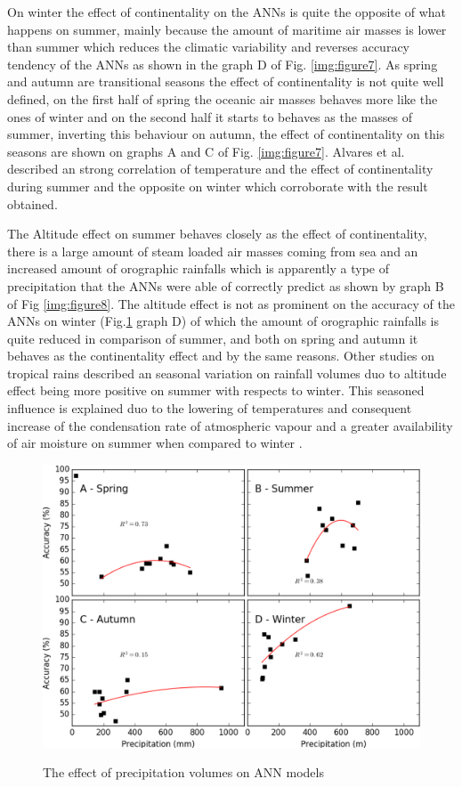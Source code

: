 On winter the effect of continentality on the ANNs is quite the opposite of what happens on summer, mainly because the amount of maritime air masses is lower than summer which reduces the climatic variability and reverses accuracy tendency of the ANNs as shown in the graph D of Fig. \ref{img:figure7}. As spring and autumn are transitional seasons the effect of continentality is not quite well defined, on the first half of spring the oceanic air masses behaves more like the ones of winter and on the second half it starts to behaves as the masses of summer, inverting this behaviour on autumn, the effect of continentality on this seasons are shown on graphs A and C of Fig. \ref{img:figure7}. Alvares et al. \cite{alvares2013modeling} described an strong correlation of temperature and the effect of continentality during summer and the opposite on winter which corroborate with the result obtained. 

The Altitude effect on summer behaves closely as the effect of continentality, there is a large amount of steam loaded air masses coming from sea and an increased amount of orographic rainfalls \cite{salati1979recycling} which is apparently a type of precipitation that the ANNs were able of correctly predict as shown by graph B of Fig \ref{img:figure8}. The altitude effect is not as prominent on the accuracy of the ANNs on winter (Fig.\ref{img:figure9} graph D) of which the amount of orographic rainfalls is quite reduced in comparison of summer, and both on spring and autumn it behaves as the continentality effect and by the same reasons. Other studies \cite{gonfiantini2001altitude} on tropical rains described an seasonal variation on rainfall volumes duo to altitude effect being more positive on summer with respects to winter. This seasoned influence is explained duo to the lowering of temperatures and consequent increase of the condensation rate of atmospheric vapour and a greater availability of air moisture on summer when compared to winter .

\begin{figure}[htb!]
 \centering
  \caption{The effect of precipitation volumes on ANN models}
 \includegraphics[scale=0.60]{capitulo_3/precipitation_accuracy}
 \label{img:figure9}
\end{figure}


